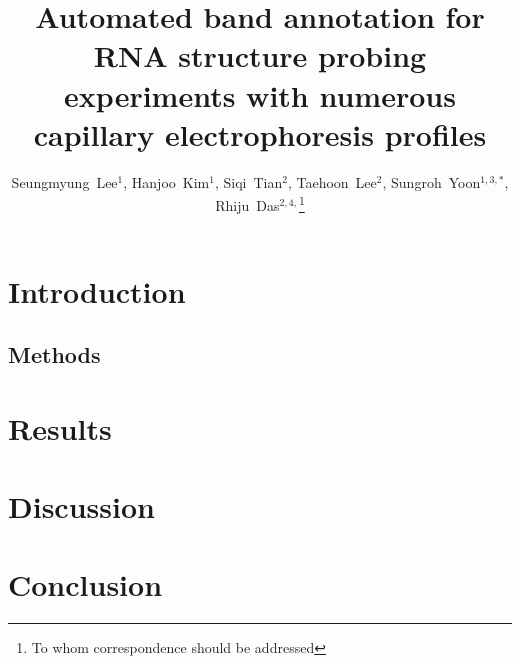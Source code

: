 \documentclass[letter]{bioinfo}
\begin{document}

\title[Automated band annotation for capillary electrophoresis]{Automated band annotation for RNA structure probing experiments with numerous capillary electrophoresis profiles}
\author[Lee \textit{et~al}]
{
Seungmyung~Lee$^{1}$,
Hanjoo~Kim$^{1}$,
Siqi~Tian$^{2}$,
Taehoon~Lee$^{2}$,
Sungroh~Yoon$^{1,3,*}$,
Rhiju~Das$^{2,4,}$\footnote{To whom correspondence should be addressed}
}
\address{
$^{1}$Department of ECE, Seoul National University, Seoul 151-744, Korea
$^{2}$Department of Biochemistry, Stanford University School of Medicine, Stanford, CA 94305, USA
$^{3}$Interdisciplinary Program in Bionformatics, Seoul National University, Seoul 151-744, Korea
$^{4}$Department of Physics, Stanford University, Stanford, CA 94305, USA
}

\history{}

\editor{}

\maketitle




\section{Introduction}\label{s:introduction}


\begin{methods}
\section{Methods}\label{s:method}

\end{methods}

\section{Results}\label{s:result}


\section{Discussion}\label{s:discussion}


\section{Conclusion}\label{s:conclusion}

\end{document}
